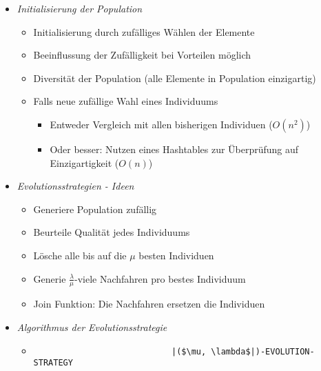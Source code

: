 \begin{itemize}
\begin{itemize}
                \item \textit{Initialisierung der Population}
                    \begin{itemize}
                        \item Initialisierung durch zufälliges Wählen der Elemente
                        \item Beeinflussung der Zufälligkeit bei Vorteilen möglich
                        \item Diversität der Population (alle Elemente in Population einzigartig)
                        \item Falls neue zufällige Wahl eines Individuums
                            \begin{itemize}
                                \item Entweder Vergleich mit allen bisherigen Individuen ($O(n^2)$)
                                \item Oder besser: Nutzen eines Hashtables zur Überprüfung auf Einzigartigkeit ($O(n)$)
                            \end{itemize}
                    \end{itemize}

                \item \textit{Evolutionsstrategien - Ideen}
                    \begin{itemize}
                        \item Generiere Population zufällig
                        \item Beurteile Qualität jedes Individuums
                        \item Lösche alle bis auf die $\mu$ besten Individuen
                        \item Generie $\frac{\lambda}{\mu}$-viele Nachfahren pro bestes Individuum
                        \item Join Funktion: Die Nachfahren ersetzen die Individuen
                    \end{itemize}
    
\pagebreak

                \item \textit{Algorithmus der Evolutionsstrategie}
                    \begin{itemize}
                        \item[]
                            \begin{verbatim}
                            |($\mu, \lambda$|)-EVOLUTION-STRATEGY


\end{verbatim}
\end{itemize}
\end{itemize}
\end{itemize}
